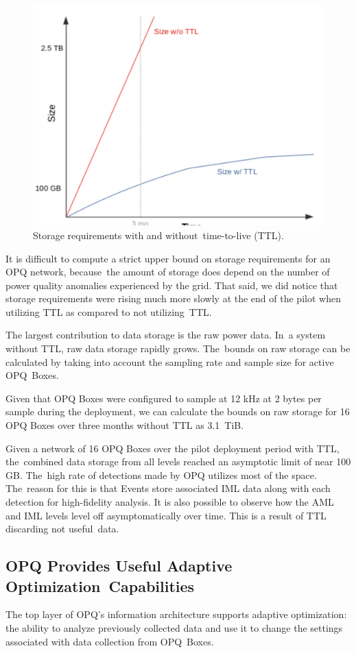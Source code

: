\documentclass[energies,article,accept,moreauthors,pdftex]{Definitions/mdpi}
\begin{document}
\begin{figure}[H]
\centering
\includegraphics[width=0.4\linewidth]{images/pilot/data-management-graph.png}
\caption{Storage requirements with and without~time-to-live (TTL).}
\label{fig:data-management-graph}
\end{figure}

It is difficult to compute a strict upper bound on storage requirements for an OPQ network, because~the amount of storage does depend on the number of power quality anomalies experienced by the grid. That said, we did notice that storage requirements were rising much more slowly at the end of the pilot when utilizing TTL as compared to not utilizing~TTL.

The largest contribution to data storage is the raw power data. In~a system without TTL, raw data storage rapidly grows. The~bounds on raw storage can be calculated by taking into account the sampling rate and sample size for active OPQ~Boxes.

Given that OPQ Boxes were configured to sample at 12 kHz at 2 bytes per sample during the deployment, we can calculate the bounds on raw storage for 16 OPQ Boxes over three months without TTL as 3.1~TiB.

Given a network of 16 OPQ Boxes over the pilot deployment period with TTL, the~combined data storage from all levels reached an asymptotic limit of near 100 GB. The~high rate of detections made by OPQ utilizes most of the space. The~reason for this is that Events store associated IML data along with each detection for high-fidelity analysis. It is also possible to observe how the AML and IML levels level off asymptomatically over time. This is a result of TTL discarding not useful~data.

\subsection{OPQ Provides Useful Adaptive Optimization~Capabilities}
\label{sec:adaptive-optimization}

The top layer of OPQ's information architecture supports adaptive optimization: the ability to analyze previously collected data and use it to change the settings associated with data collection from OPQ~Boxes.
\end{document}
